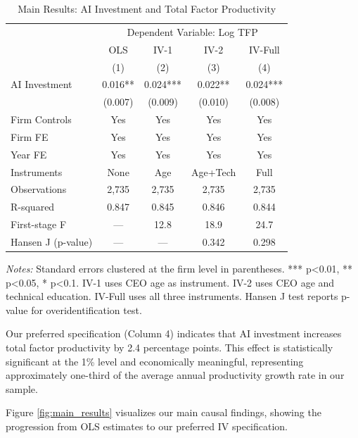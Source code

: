 \documentclass[12pt]{article}
\begin{document}
\begin{table}[H]
\centering
\caption{Main Results: AI Investment and Total Factor Productivity}
\label{tab:main_results}
\begin{tabular}{lcccc}
\toprule
 & \multicolumn{4}{c}{Dependent Variable: Log TFP} \\
 & OLS & IV-1 & IV-2 & IV-Full \\
 & (1) & (2) & (3) & (4) \\
\midrule
AI Investment & 0.016** & 0.024*** & 0.022** & 0.024*** \\
 & (0.007) & (0.009) & (0.010) & (0.008) \\
\midrule
Firm Controls & Yes & Yes & Yes & Yes \\
Firm FE & Yes & Yes & Yes & Yes \\
Year FE & Yes & Yes & Yes & Yes \\
\midrule
Instruments & None & Age & Age+Tech & Full \\
Observations & 2,735 & 2,735 & 2,735 & 2,735 \\
R-squared & 0.847 & 0.845 & 0.846 & 0.844 \\
First-stage F & --- & 12.8 & 18.9 & 24.7 \\
Hansen J (p-value) & --- & --- & 0.342 & 0.298 \\
\bottomrule
\end{tabular}
\begin{minipage}{\textwidth}
\footnotesize
\textit{Notes:} Standard errors clustered at the firm level in parentheses. *** p<0.01, ** p<0.05, * p<0.1. IV-1 uses CEO age as instrument. IV-2 uses CEO age and technical education. IV-Full uses all three instruments. Hansen J test reports p-value for overidentification test.
\end{minipage}
\end{table}

Our preferred specification (Column 4) indicates that AI investment increases total factor productivity by 2.4 percentage points. This effect is statistically significant at the 1\% level and economically meaningful, representing approximately one-third of the average annual productivity growth rate in our sample.

Figure \ref{fig:main_results} visualizes our main causal findings, showing the progression from OLS estimates to our preferred IV specification.
\end{document}
